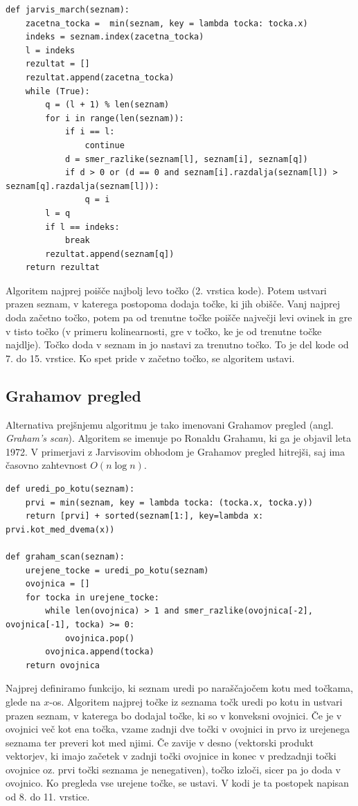 \documentclass[a4paper]{article}
\begin{document}
\begin{lstlisting}
def jarvis_march(seznam):
    zacetna_tocka =  min(seznam, key = lambda tocka: tocka.x)
    indeks = seznam.index(zacetna_tocka) 
    l = indeks
    rezultat = []
    rezultat.append(zacetna_tocka)
    while (True):
        q = (l + 1) % len(seznam)      
        for i in range(len(seznam)):
            if i == l:
                continue
            d = smer_razlike(seznam[l], seznam[i], seznam[q])
            if d > 0 or (d == 0 and seznam[i].razdalja(seznam[l]) > seznam[q].razdalja(seznam[l])):
                q = i
        l = q
        if l == indeks:
            break    
        rezultat.append(seznam[q])
    return rezultat
\end{lstlisting}

Algoritem najprej poišče najbolj levo točko (2. vrstica kode). Potem ustvari prazen seznam, v katerega postopoma dodaja točke, ki jih obišče. Vanj najprej doda začetno točko,
potem pa od trenutne točke poišče največji levi ovinek in gre v tisto točko (v primeru kolinearnosti, gre v točko, ke je od trenutne točke najdlje). Točko doda v seznam 
in jo nastavi za trenutno točko. To je del kode od 7. do 15. vrstice. Ko spet pride v začetno točko, se algoritem ustavi.

\newpage
\subsection{Grahamov pregled}
Alternativa prejšnjemu algoritmu je tako imenovani Grahamov pregled (angl. \textit{Graham's scan}). Algoritem se imenuje po Ronaldu Grahamu, ki ga je objavil leta 1972. 
V primerjavi z Jarvisovim obhodom je Grahamov pregled hitrejši, saj ima časovno zahtevnost $O(n \log n)$.

\begin{lstlisting}
def uredi_po_kotu(seznam):
    prvi = min(seznam, key = lambda tocka: (tocka.x, tocka.y))
    return [prvi] + sorted(seznam[1:], key=lambda x: prvi.kot_med_dvema(x))

def graham_scan(seznam):
    urejene_tocke = uredi_po_kotu(seznam)
    ovojnica = []
    for tocka in urejene_tocke:
        while len(ovojnica) > 1 and smer_razlike(ovojnica[-2], ovojnica[-1], tocka) >= 0:           
            ovojnica.pop()
        ovojnica.append(tocka)
    return ovojnica
\end{lstlisting}

Najprej definiramo funkcijo, ki seznam uredi po naraščajočem kotu med točkama, glede na $x$-os. Algoritem najprej točke iz seznama točk uredi po kotu in ustvari prazen seznam, 
v katerega bo dodajal točke, ki so v konveksni ovojnici. Če je v ovojnici več kot ena točka, vzame zadnji dve točki v ovojnici in prvo iz urejenega seznama ter preveri kot med njimi.
Če zavije v desno (vektorski produkt vektorjev, ki imajo začetek v zadnji točki ovojnice in konec v predzadnji točki ovojnice oz. prvi točki seznama je nenegativen), točko izloči, 
sicer pa jo doda v ovojnico. Ko pregleda vse urejene točke, se ustavi. V kodi je ta postopek napisan od 8. do 11. vrstice.
\end{document}
